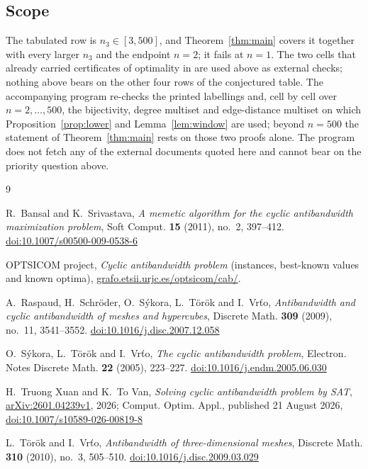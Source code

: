 \documentclass[11pt]{amsart}
\begin{document}
\subsection*{Scope}
The tabulated row is $n_3\in[3,500]$, and Theorem~\ref{thm:main} covers it together with every
larger $n_3$ and the endpoint $n=2$; it fails at $n=1$. The two cells that already carried
certificates of optimality in \cite{SAT2026} are used above as external checks; nothing above bears
on the other four rows of the conjectured table.
The accompanying program re-checks the printed labellings and, cell by cell over
$n = 2,\dots,500$, the bijectivity, degree multiset and edge-distance multiset on which
Proposition~\ref{prop:lower} and Lemma~\ref{lem:window} are used; beyond $n = 500$ the statement of
Theorem~\ref{thm:main} rests on those two proofs alone. The program does not fetch any of the
external documents quoted here and cannot bear on the priority question above.

\begin{thebibliography}{9}

R.~Bansal and K.~Srivastava,
\emph{A memetic algorithm for the cyclic antibandwidth maximization problem},
Soft Comput. \textbf{15} (2011), no.~2, 397--412.
\href{https://doi.org/10.1007/s00500-009-0538-6}{doi:10.1007/s00500-009-0538-6}

OPTSICOM project,
\emph{Cyclic antibandwidth problem} (instances, best-known values and known optima),
\href{https://grafo.etsii.urjc.es/optsicom/cab/}{grafo.etsii.urjc.es/optsicom/cab/}.

A.~Raspaud, H.~Schr\"oder, O.~S\'ykora, L.~T\"or\"ok and I.~Vr\v{t}o,
\emph{Antibandwidth and cyclic antibandwidth of meshes and hypercubes},
Discrete Math. \textbf{309} (2009), no.~11, 3541--3552.
\href{https://doi.org/10.1016/j.disc.2007.12.058}{doi:10.1016/j.disc.2007.12.058}

O.~S\'ykora, L.~T\"or\"ok and I.~Vr\v{t}o,
\emph{The cyclic antibandwidth problem},
Electron. Notes Discrete Math. \textbf{22} (2005), 223--227.
\href{https://doi.org/10.1016/j.endm.2005.06.030}{doi:10.1016/j.endm.2005.06.030}

H.~Truong Xuan and K.~To Van,
\emph{Solving cyclic antibandwidth problem by SAT},
\href{https://arxiv.org/abs/2601.04239v1}{arXiv:2601.04239v1}, 2026;
Comput. Optim. Appl., published 21 August 2026,
\href{https://doi.org/10.1007/s10589-026-00819-8}{doi:10.1007/s10589-026-00819-8}

L.~T\"or\"ok and I.~Vr\v{t}o,
\emph{Antibandwidth of three-dimensional meshes},
Discrete Math. \textbf{310} (2010), no.~3, 505--510.
\href{https://doi.org/10.1016/j.disc.2009.03.029}{doi:10.1016/j.disc.2009.03.029}

\end{thebibliography}
\end{document}
